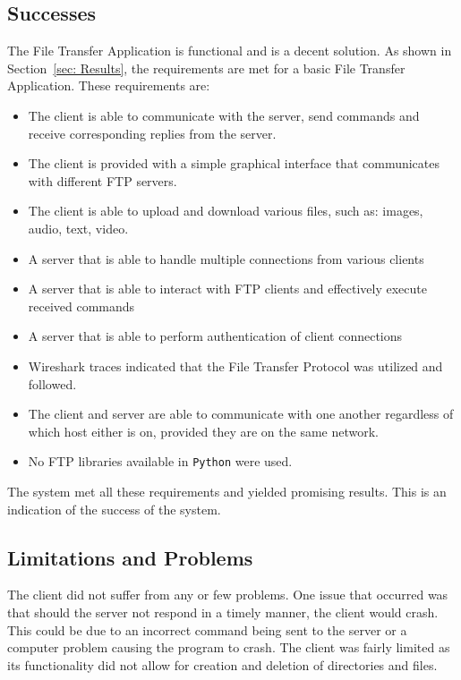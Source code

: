 \documentclass[10pt,twocolumn]{witseiepaper}
\def\code#1{\texttt{#1}}
\begin{document}
\subsection{Successes}
\label{sec: Successes}
The File Transfer Application is functional and is a decent solution. As shown in Section~\ref{sec: Results}, the requirements are met for a basic File Transfer Application. These requirements are:
\begin{itemize}
\item The client is able to communicate with the server, send commands and receive corresponding replies from the server.
\item The client is provided with a simple graphical interface that communicates with different FTP servers.
\item The client is able to upload and download various files, such as: images, audio, text, video.
\item A server that is able to handle multiple connections from various clients
\item A server that is able to interact with FTP clients and effectively execute received commands
\item A server that is able to perform authentication of client connections
\item Wireshark traces indicated that the File Transfer Protocol was utilized and followed.
\item The client and server are able to communicate with one another regardless of which host either is on, provided they are on the same network.
\item No FTP libraries available in \code{Python} were used.

\end{itemize}

The system met all these requirements and yielded promising results. This is an indication of the success of the system.


\subsection{Limitations and Problems}
\label{sec: Limitations and Problems}
The client did not suffer from any or few problems. One issue that occurred was that should the server not respond in a timely manner, the client would crash. This could be due to an incorrect command being sent to the server or a computer problem causing the program to crash. The client was fairly limited as its functionality did not allow for creation and deletion of directories and files. 
\end{document}
